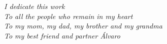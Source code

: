 \thispagestyle{empty}
\vspace*{\fill}
\begin{flushright}
\large\itshape
I dedicate this work \\
To all the people who remain in my heart\\
To my mom, my dad, my brother and my grandma\\ 
To my best friend and partner  Álvaro\\
\end{flushright}
\vspace*{30.67bp}
